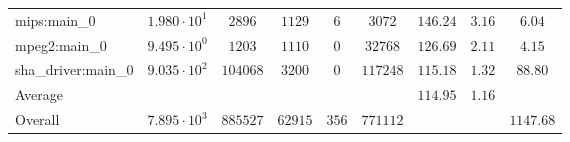 \begin{tabular}{|l|c|c|c|c|c|c|c|c|}
mips:main\_0            & $ 1.980 \cdot 10^{1} $ & $ 2896   $ & $ 1129  $ & $ 6   $ & $ 3072   $ & $ 146.24      $ & $ 3.16    $ & $ 6.04    $ \\
mpeg2:main\_0           & $ 9.495 \cdot 10^{0} $ & $ 1203   $ & $ 1110  $ & $ 0   $ & $ 32768  $ & $ 126.69      $ & $ 2.11    $ & $ 4.15    $ \\
sha\_driver:main\_0     & $ 9.035 \cdot 10^{2} $ & $ 104068 $ & $ 3200  $ & $ 0   $ & $ 117248 $ & $ 115.18      $ & $ 1.32    $ & $ 88.80   $ \\
\hline
Average                 & $                    $ & $        $ & $       $ & $     $ & $        $ & $ 114.95      $ & $ 1.16    $ & $         $ \\
\hline
Overall                 & $ 7.895 \cdot 10^{3} $ & $ 885527 $ & $ 62915 $ & $ 356 $ & $ 771112 $ & $             $ & $         $ & $ 1147.68 $ \\
\hline
\end{tabular}
